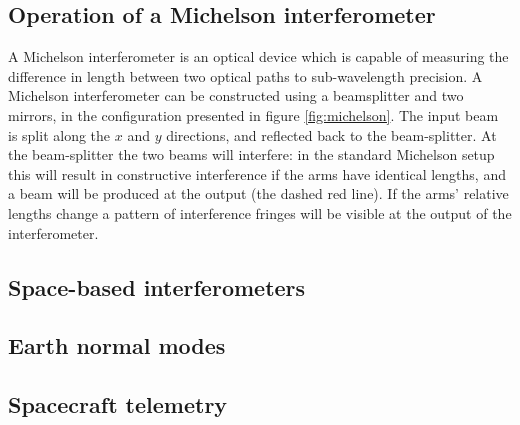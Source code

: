 \documentclass{kentigern}
\begin{document}
\subsection{Operation of a Michelson interferometer}
\label{sec:Michelson}
%
%
A Michelson interferometer is an optical device which is capable of
measuring the difference in length between two optical paths to
sub-wavelength precision. A Michelson interferometer can be
constructed using a beamsplitter and two mirrors, in the configuration
presented in figure \ref{fig:michelson}. The input beam is split along
the $x$ and $y$ directions, and reflected back to the
beam-splitter. At the beam-splitter the two beams will interfere: in
the standard Michelson setup this will result in constructive
interference if the arms have identical lengths, and a beam will be
produced at the output (the dashed red line). If the arms' relative
lengths change a pattern of interference fringes will be visible at
the output of the interferometer.

\subsection{Space-based interferometers}
\label{sec:space-based-interf}

\subsection{Earth normal modes}
\label{sec:earth-normal-modes}

\subsection{Spacecraft telemetry}
\label{sec:spacecraft-telemetry}
\end{document}
